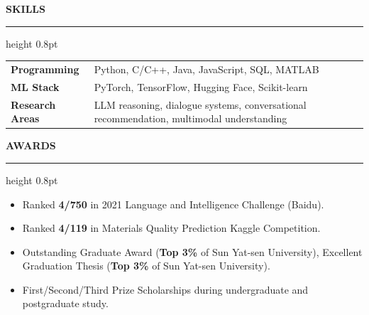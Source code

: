 \documentclass[11pt,a4paper]{article}
\newcommand{\Section}[1]{%
    \vspace{0.50em}
    {\color{Accent}\bfseries\large #1}\par
    \vspace{0.26em}
    {\color{RuleGray}\hrule height 0.8pt}
    \vspace{0.42em}
}
\begin{document}
\Section{SKILLS}
\begin{tabularx}{\linewidth}{@{}>{\bfseries}p{2.9cm}X@{}}
Programming & Python, C/C++, Java, JavaScript, SQL, MATLAB \\
ML Stack & PyTorch, TensorFlow, Hugging Face, Scikit-learn \\
Research Areas & LLM reasoning, dialogue systems, conversational recommendation, multimodal understanding
\end{tabularx}

\Section{AWARDS}
\begin{itemize}
    \item Ranked \textbf{4/750} in 2021 Language and Intelligence Challenge (Baidu).
    \item Ranked \textbf{4/119} in Materials Quality Prediction Kaggle Competition.
    \item Outstanding Graduate Award (\textbf{Top 3\%} of Sun Yat-sen University), Excellent Graduation Thesis (\textbf{Top 3\%} of Sun Yat-sen University).
    \item First/Second/Third Prize Scholarships during undergraduate and postgraduate study.
\end{itemize}
\end{document}

